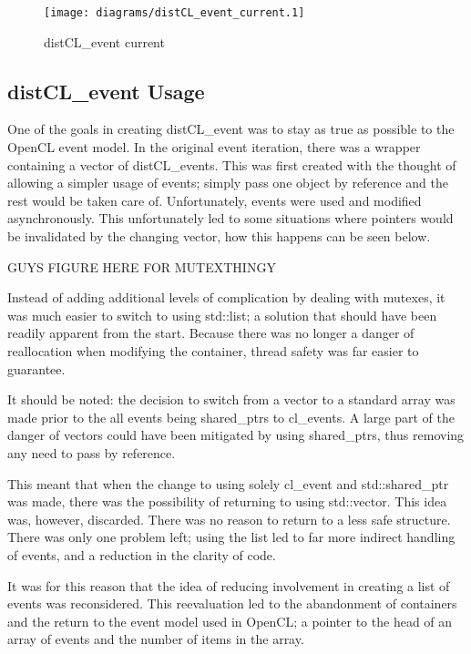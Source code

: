 \documentclass[report.tex]{subfiles}
\begin{document}
            \begin{figure}[htbp]
                \centering
                \texttt{[image: diagrams/distCL\_event\_current.1]}
                \caption{distCL\_event current}
                \label{fig:distCL_event_uml_current}
            \end{figure}


    \subsection{distCL\_event Usage} %
    \label{sub:distcl_event_usage}
        One of the goals in creating distCL\_event was to stay as true as possible to the OpenCL event model. In the original event iteration, there was a wrapper containing a vector of distCL\_events. This was first created with the thought of allowing a simpler usage of events; simply pass one object by reference and the rest would be taken care of. Unfortunately, events were used and modified asynchronously. This unfortunately led to some situations where pointers would be invalidated by the changing vector, how this happens can be seen below.

        GUYS FIGURE HERE FOR MUTEXTHINGY

        Instead of adding additional levels of complication by dealing with mutexes, it was much easier to switch to using std::list; a solution that should have been readily apparent from the start. Because there was no longer a danger of reallocation when modifying the container, thread safety was far easier to guarantee.
        
        It should be noted: the decision to switch from a vector to a standard array was made prior to the all events being shared\_ptrs to cl\_events. A large part of the danger of vectors could have been mitigated by using shared\_ptrs, thus removing any need to pass by reference.

        This meant that when the change to using solely cl\_event and std::shared\_ptr was made, there was the possibility of returning to using std::vector. This idea was, however, discarded. There was no reason to return to a less safe structure. There was only one problem left; using the list led to far more indirect handling of events, and a reduction in the clarity of code. 

        It was for this reason that the idea of reducing involvement in creating a list of events was reconsidered. This reevaluation led to the abandonment of containers and the return to the event model used in OpenCL; a pointer to the head of an array of events and the number of items in the array.
\end{document}
